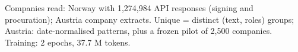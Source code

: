 Companies read: Norway with 1,274,984 API responses (signing and procuration); Austria company extracts. Unique = distinct (text, roles) groups; Austria: date-normalised patterns, plus a frozen pilot of 2,500 companies. Training: 2 epochs, 37.7 M tokens.
